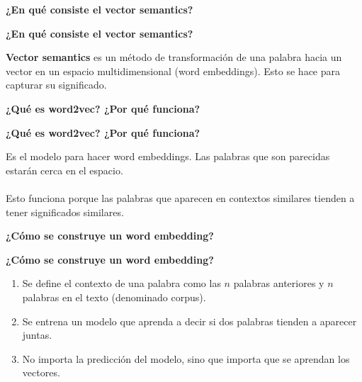 \documentclass[10pt]{memoir}
\begin{document}

\clearpage
\begin{center}
	\textbf{\Large ¿En qué consiste el vector semantics?} \\
\end{center}

\clearpage
\begin{center}
	\textbf{\Large ¿En qué consiste el vector semantics?} \\
\end{center}
\noindent \textbf{Vector semantics} es un método de transformación de una palabra hacia un vector en un espacio multidimensional (word embeddings). Esto se hace para capturar su significado.

\clearpage
\begin{center}
	\textbf{\Large ¿Qué es word2vec? ¿Por qué funciona?} \\
\end{center}

\clearpage
\begin{center}
	\textbf{\Large ¿Qué es word2vec? ¿Por qué funciona?} \\
\end{center}
\noindent Es el modelo para hacer word embeddings. Las palabras que son parecidas estarán cerca en el espacio. \\
\\
\noindent Esto funciona porque las palabras que aparecen en contextos similares tienden a tener significados similares.

\clearpage
\begin{center}
	\textbf{\Large ¿Cómo se construye un word embedding?} \\
\end{center}

\clearpage
\begin{center}
	\textbf{\Large ¿Cómo se construye un word embedding?} \\
\end{center}
\begin{enumerate}
	\item Se define el contexto de una palabra como las $n$ palabras anteriores y $n$ palabras en el texto (denominado corpus).
	\item Se entrena un modelo que aprenda a decir si dos palabras tienden a aparecer juntas.
	\item No importa la predicción del modelo, sino que importa que se aprendan los vectores.
\end{enumerate}
\end{document}
